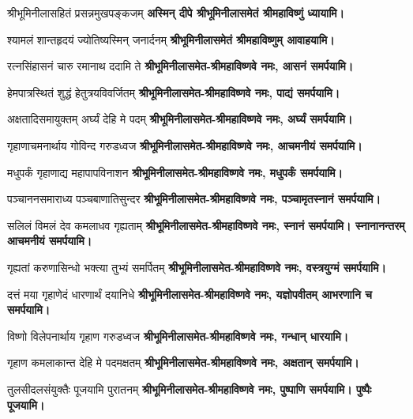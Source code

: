 \renewcommand{\devAya}{श्रीभूमिनीलासमेत-श्रीमहाविष्णवे नमः,}
\begin{center}

{श्रीभूमिनीलासहितं प्रसन्नमुखपङ्कजम्}
\textbf{अस्मिन् दीपे श्रीभूमिनीलासमेतं श्रीमहाविष्णुं ध्यायामि।}
\medskip

{श्यामलं शान्तहृदयं ज्योतिष्यस्मिन् जनार्दनम्}
\textbf{श्रीभूमिनीलासमेतं श्रीमहाविष्णुम् आवाहयामि।}
\medskip

{रत्नसिंहासनं चारु रमानाथ ददामि ते}
\textbf{\devAya{} आसनं समर्पयामि।}
\medskip

{हेमपात्रस्थितं शुद्धं हेतुत्रयविवर्जितम्}
\textbf{\devAya{} पाद्यं समर्पयामि।}
\medskip

{अक्षतादिसमायुक्तम् अर्घ्यं देहि मे पदम्}
\textbf{\devAya{} अर्घ्यं समर्पयामि।}
\medskip

{गृहाणाचमनार्थाय गोविन्द गरुडध्वज}
\textbf{\devAya{} आचमनीयं समर्पयामि।}
\medskip

{मधुपर्कं गृहाणाद्य महापापविनाशन}
\textbf{\devAya{} मधुपर्कं समर्पयामि।}
\medskip

{पञ्चाननसमाराध्य पञ्चबाणातिसुन्दर}
\textbf{\devAya{} पञ्चामृतस्नानं समर्पयामि।}
\medskip

{सलिलं विमलं देव कमलाधव गृह्यताम्}
\textbf{\devAya{} स्नानं समर्पयामि। स्नानानन्तरम् आचमनीयं समर्पयामि।}
\medskip

{गृह्यतां करुणासिन्धो भक्त्या तुभ्यं समर्पितम्}
\textbf{\devAya{} वस्त्रयुग्मं समर्पयामि।}
\medskip

{दत्तं मया गृहाणेदं धारणार्थं दयानिधे}
\textbf{\devAya{} यज्ञोपवीतम् आभरणानि च समर्पयामि।}
\medskip

{विष्णो विलेपनार्थाय गृहाण गरुडध्वज}
\textbf{\devAya{} गन्धान् धारयामि।}
\medskip

{गृहाण कमलाकान्त देहि मे पदमक्षतम्}
\textbf{\devAya{} अक्षतान् समर्पयामि।}
\medskip

{तुलसीदलसंयुक्तैः पूजयामि पुरातनम्}
\textbf{\devAya{} पुष्पाणि समर्पयामि। पुष्पैः पूजयामि।}
\medskip

\end{center}

